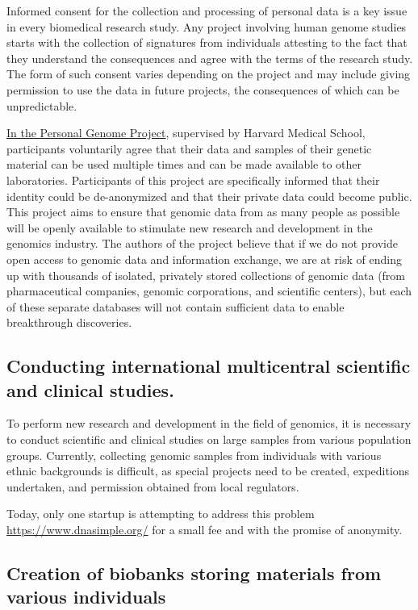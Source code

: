 Informed consent for the collection and processing of personal data is a key issue in every biomedical research study. Any project involving human genome studies starts with the collection of signatures from individuals attesting to the fact that they understand the consequences and agree with the terms of the research study. The form of such consent varies depending on the project and may include giving permission to use the data in future projects, the consequences of which can be unpredictable.


\href{http://www.personalgenomes.org/}{In the Personal Genome Project},  supervised by Harvard Medical School, participants voluntarily agree that their data and samples of their genetic material can be used multiple times and can be made available to other laboratories. Participants of this project are specifically informed that their identity could be de-anonymized and that their private data could become public. This project aims to ensure that genomic data from as many people as possible will be openly available to stimulate new research and development in the genomics industry. The authors of the project believe that if we do not provide open access to genomic data and information exchange, we are at risk of ending up with thousands of isolated, privately stored collections of genomic data (from pharmaceutical companies, genomic corporations, and scientific centers), but each of these separate databases will not contain sufficient data to enable breakthrough discoveries.

\subsection[Multicentral scientific and clinical studies]{%
  Conducting international multicentral scientific and clinical studies.}

To perform new research and development in the field of genomics, it is necessary to conduct scientific and clinical studies on large samples from various population groups. Currently, collecting genomic samples from individuals with various ethnic backgrounds is difficult, as special projects need to be created, expeditions undertaken, and permission obtained from local regulators.

Today, only one startup is attempting to address this problem
\url{https://www.dnasimple.org/} for a small fee and with the promise of anonymity.

\subsection[Biobanks storing materials from various individuals]{Creation of biobanks storing materials from various individuals}

